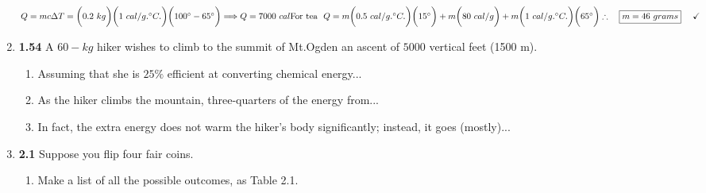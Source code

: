 \documentclass[fleqn]{article}
\begin{document}
\begin{enumerate}
        \textcolor{hwColor}{
          \\
          $
            Q=mc \Delta T=\bigg( 0.2 ~ kg \bigg) \bigg( 1 ~ cal/g.^{\circ}C. \bigg) \bigg( 100^{\circ}-65^{\circ} \bigg)
            \Longrightarrow Q=7000 ~ cal
            \\
            \\
            \\
            \text{For tea} ~~ Q=m \bigg( 0.5 ~ cal/g.^{\circ}C. \bigg) \bigg( 15^{\circ} \bigg)
            +m \bigg( 80 ~ cal/g \bigg)
            +m\bigg( 1 ~ cal/g.^{\circ}C. \bigg) \bigg( 65^{\circ} \bigg)
            \\
            \\
            \\
            \therefore ~~~ \boxed{
              m=46 ~ grams
            } ~~~~ \checkmark
            \\
            \\
          $
        }

    \item \textbf{1.54} A $60-kg$ hiker wishes to climb to the summit of Mt.Ogden an ascent of $5000$ vertical
    feet (1500 m).
    \begin{enumerate}
      \item Assuming that she is $25\%$ efficient at converting chemical energy...

      \item As the hiker climbs the mountain, three-quarters of the energy from...


      \item In fact, the extra energy does not warm the hiker's body significantly; instead, it goes (mostly)...


    \end{enumerate}


    \item \textbf{2.1} Suppose you flip four fair coins.
    \begin{enumerate}
      \item Make a list of all the possible outcomes, as Table 2.1.


\end{enumerate}
\end{enumerate}
\end{document}
